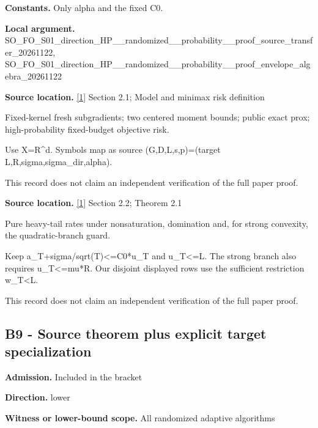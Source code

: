 \documentclass[10pt,a4paper]{article}
\begin{document}
\textbf{Constants.} Only alpha and the fixed C0.



\textbf{Local argument.} SO\_FO\_S01\_direction\_HP\_\_\allowbreak{}randomized\_\_probability\_\allowbreak{}\_proof\_source\_transfer\_2\allowbreak{}0261122, SO\_FO\_S01\_direction\_HP\_\_\allowbreak{}randomized\_\_probability\_\allowbreak{}\_proof\_envelope\_algebra\_\allowbreak{}20261122



\textbf{Source location.} \href{https://arxiv.org/html/2610.00260v2}{[1]} Section 2.1; Model and minimax risk definition



Fixed-kernel fresh subgradients; two centered moment bounds; public exact prox; high-probability fixed-budget objective risk.



Use X=R\textasciicircum{}d. Symbols map as source (G,D,L,s,p)=(target L,R,sigma,sigma\_dir,alpha).



This record does not claim an independent verification of the full paper proof.



\textbf{Source location.} \href{https://arxiv.org/html/2610.00260v2}{[1]} Section 2.2; Theorem 2.1



Pure heavy-tail rates under nonsaturation, domination and, for strong convexity, the quadratic-branch guard.



Keep a\_T+sigma/sqrt(T)<=C0*u\_T and u\_T<=L. The strong branch also requires u\_T<=mu*R. Our disjoint displayed rows use the sufficient restriction w\_T<L.



This record does not claim an independent verification of the full paper proof.



\subsection{B9 - Source theorem plus explicit target specialization}


\textbf{Admission.} Included in the bracket



\textbf{Direction.} lower



\textbf{Witness or lower-bound scope.} All randomized adaptive algorithms
\end{document}
